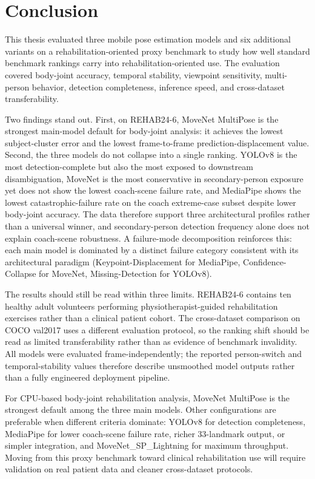 \chapter{Conclusion}
\label{ch:conclusion}

This thesis evaluated three mobile pose estimation models and six additional variants on a rehabilitation-oriented proxy benchmark to study how well standard benchmark rankings carry into rehabilitation-oriented use. The evaluation covered body-joint accuracy, temporal stability, viewpoint sensitivity, multi-person behavior, detection completeness, inference speed, and cross-dataset transferability.

Two findings stand out. First, on REHAB24-6, MoveNet MultiPose is the strongest main-model default for body-joint analysis: it achieves the lowest subject-cluster error and the lowest frame-to-frame prediction-displacement value. Second, the three models do not collapse into a single ranking. YOLOv8 is the most detection-complete but also the most exposed to downstream disambiguation, MoveNet is the most conservative in secondary-person exposure yet does not show the lowest coach-scene failure rate, and MediaPipe shows the lowest catastrophic-failure rate on the coach extreme-case subset despite lower body-joint accuracy. The data therefore support three architectural profiles rather than a universal winner, and secondary-person detection frequency alone does not explain coach-scene robustness. A failure-mode decomposition reinforces this: each main model is dominated by a distinct failure category consistent with its architectural paradigm (Keypoint-Displacement for MediaPipe, Confidence-Collapse for MoveNet, Missing-Detection for YOLOv8).

The results should still be read within three limits. REHAB24-6 contains ten healthy adult volunteers performing physiotherapist-guided rehabilitation exercises rather than a clinical patient cohort. The cross-dataset comparison on COCO val2017 uses a different evaluation protocol, so the ranking shift should be read as limited transferability rather than as evidence of benchmark invalidity. All models were evaluated frame-independently; the reported person-switch and temporal-stability values therefore describe unsmoothed model outputs rather than a fully engineered deployment pipeline.

For CPU-based body-joint rehabilitation analysis, MoveNet MultiPose is the strongest default among the three main models. Other configurations are preferable when different criteria dominate: YOLOv8 for detection completeness, MediaPipe for lower coach-scene failure rate, richer 33-landmark output, or simpler integration, and MoveNet\_SP\_Lightning for maximum throughput. Moving from this proxy benchmark toward clinical rehabilitation use will require validation on real patient data and cleaner cross-dataset protocols.
